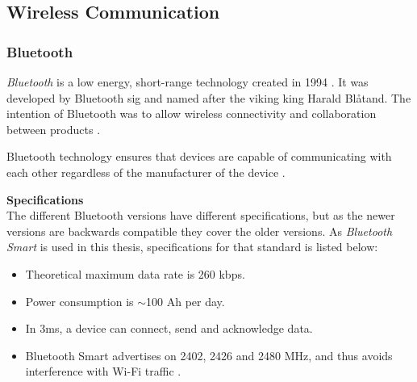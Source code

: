\subsection{Wireless Communication}
\subsubsection{Bluetooth}
\textit{Bluetooth} is a low energy, short-range technology created in 1994 \cite{ble2016}. It was developed by Bluetooth \acrfull{sig} and named after the viking king Harald Blåtand. The intention of Bluetooth was to allow wireless connectivity and collaboration between products \cite{bluetoothsig2016}.

Bluetooth technology ensures that devices are capable of communicating with each other regardless of the manufacturer of the device \cite{prabhu2004}.  

\textbf{Specifications}
\\
The different Bluetooth versions have different specifications, but as the newer versions are backwards compatible \cite{bluetoothreport2013} they cover the older versions. As \textit{Bluetooth Smart} is used in this thesis, specifications for that standard is listed below:

\begin{itemize}
    \item Theoretical maximum data rate is 260 kbps.
    \item Power consumption is $\sim$100 \micro Ah per day.
    \item In 3ms, a device can connect, send and acknowledge data.
    \item Bluetooth Smart advertises on 2402, 2426 and 2480 MHz, and thus avoids interference with Wi-Fi traffic \cite{csr2010}.
\end{itemize}